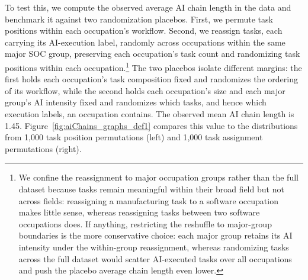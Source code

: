 To test this, we compute the observed average AI chain length in the data and benchmark it against two randomization placebos.
First, we permute task positions within each occupation's workflow.
Second, we reassign tasks, each carrying its AI-execution label, randomly across occupations within the same major SOC group, preserving each occupation's task count and randomizing task positions within each occupation.\footnote{
We confine the reassignment to major occupation groups rather than the full dataset because tasks remain meaningful within their broad field but not across fields: reassigning a manufacturing task to a software occupation makes little sense, whereas reassigning tasks between two software occupations does.
If anything, restricting the reshuffle to major-group boundaries is the more conservative choice: each major group retains its AI intensity under the within-group reassignment, whereas randomizing tasks across the full dataset would scatter AI-executed tasks over all occupations and push the placebo average chain length even lower.}
The two placebos isolate different margins: the first holds each occupation's task composition fixed and randomizes the ordering of its workflow, while the second holds each occupation's size and each major group's AI intensity fixed and randomizes which tasks, and hence which execution labels, an occupation contains.
The observed mean AI chain length is 1.45.
Figure~\ref{fig:aiChains_graphs_def1} compares this value to the distributions from 1{,}000 task position permutations (left) and 1{,}000 task assignment permutations (right).
